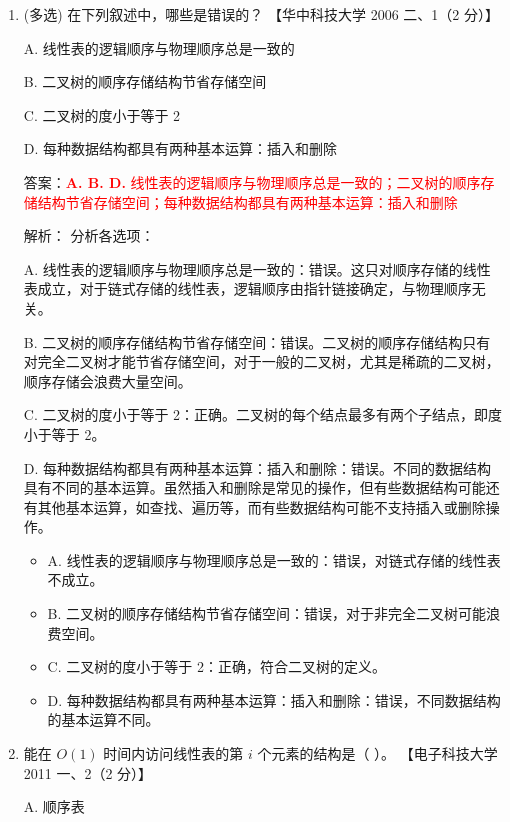 \documentclass[lang=cn,newtx,10pt,scheme=chinese]{../../../elegantbook}
\begin{document}
\begin{enumerate}
        \item (多选) 在下列叙述中，哪些是错误的？  
        【华中科技大学 2006 二、1（2 分）】 
    
        A. 线性表的逻辑顺序与物理顺序总是一致的  
    
        B. 二叉树的顺序存储结构节省存储空间  
    
        C. 二叉树的度小于等于 2  
    
        D. 每种数据结构都具有两种基本运算：插入和删除  

        答案：\textcolor{red}{\textbf{A. B. D.} 线性表的逻辑顺序与物理顺序总是一致的；二叉树的顺序存储结构节省存储空间；每种数据结构都具有两种基本运算：插入和删除}

        解析：
        分析各选项：
        
        A. 线性表的逻辑顺序与物理顺序总是一致的：错误。这只对顺序存储的线性表成立，对于链式存储的线性表，逻辑顺序由指针链接确定，与物理顺序无关。
        
        B. 二叉树的顺序存储结构节省存储空间：错误。二叉树的顺序存储结构只有对完全二叉树才能节省存储空间，对于一般的二叉树，尤其是稀疏的二叉树，顺序存储会浪费大量空间。
        
        C. 二叉树的度小于等于 2：正确。二叉树的每个结点最多有两个子结点，即度小于等于 2。
        
        D. 每种数据结构都具有两种基本运算：插入和删除：错误。不同的数据结构具有不同的基本运算。虽然插入和删除是常见的操作，但有些数据结构可能还有其他基本运算，如查找、遍历等，而有些数据结构可能不支持插入或删除操作。

        \begin{itemize}
            \item A. 线性表的逻辑顺序与物理顺序总是一致的：错误，对链式存储的线性表不成立。
            \item B. 二叉树的顺序存储结构节省存储空间：错误，对于非完全二叉树可能浪费空间。
            \item C. 二叉树的度小于等于 2：正确，符合二叉树的定义。
            \item D. 每种数据结构都具有两种基本运算：插入和删除：错误，不同数据结构的基本运算不同。
        \end{itemize}
    
    
        
    
        \item 能在 $O(1)$ 时间内访问线性表的第 $i$ 个元素的结构是（ ）。  
        【电子科技大学 2011 一、2（2 分）】  
    
        A. 顺序表  
    

\end{enumerate}
\end{document}
